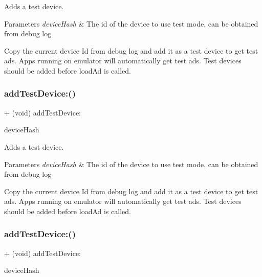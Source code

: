 Adds a test device.


\begin{DoxyParams}{Parameters}
{\em device\+Hash} & The id of the device to use test mode, can be obtained from debug log\\
\hline
\end{DoxyParams}
Copy the current device Id from debug log and add it as a test device to get test ads. Apps running on emulator will automatically get test ads. Test devices should be added before load\+Ad is called. \mbox{\label{interfaceFBAdSettings_adf2fc44110adb3613551750bf42671af}} 
\subsubsection{\texorpdfstring{add\+Test\+Device\+:()}{addTestDevice:()}\hspace{0.1cm}{\footnotesize\ttfamily [4/5]}}
{\footnotesize\ttfamily + (void) add\+Test\+Device\+: \begin{DoxyParamCaption}\item[{(N\+S\+String $\ast$)}]{device\+Hash }\end{DoxyParamCaption}}

Adds a test device.


\begin{DoxyParams}{Parameters}
{\em device\+Hash} & The id of the device to use test mode, can be obtained from debug log\\
\hline
\end{DoxyParams}
Copy the current device Id from debug log and add it as a test device to get test ads. Apps running on emulator will automatically get test ads. Test devices should be added before load\+Ad is called. \mbox{\label{interfaceFBAdSettings_adf2fc44110adb3613551750bf42671af}} 
\subsubsection{\texorpdfstring{add\+Test\+Device\+:()}{addTestDevice:()}\hspace{0.1cm}{\footnotesize\ttfamily [5/5]}}
{\footnotesize\ttfamily + (void) add\+Test\+Device\+: \begin{DoxyParamCaption}\item[{(N\+S\+String $\ast$)}]{device\+Hash }\end{DoxyParamCaption}}

